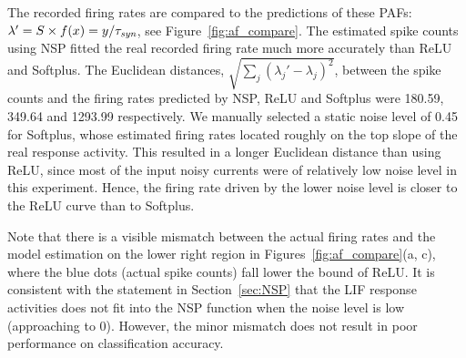 	The recorded firing rates are compared to the predictions of these PAFs: $\lambda' = S \times f(x) = y/\tau_{\textit{\textrm{syn}}}$, see Figure~\ref{fig:af_compare}.
	The estimated spike counts using NSP fitted the real recorded firing rate much more accurately than ReLU and Softplus.
	The Euclidean distances, $\sqrt{\sum_{j}(\lambda_j' - \lambda_j)^2}$, between the spike counts and the firing rates predicted by NSP, ReLU and Softplus were 180.59, 349.64 and 1293.99 respectively.
	We manually selected a static noise level of 0.45 for Softplus, whose estimated firing rates located roughly on the top slope of the real response activity.
	This resulted in a longer Euclidean distance than using ReLU, since most of the input noisy currents were of relatively low noise level in this experiment.
	Hence, the firing rate driven by the lower noise level is closer to the ReLU curve than to Softplus.

	Note that there is a visible mismatch between the actual firing rates and the model estimation on the lower right region in Figures~\ref{fig:af_compare}(a, c), where the blue dots (actual spike counts) fall lower the bound of ReLU.
	It is consistent with the statement in Section~\ref{sec:NSP} that the LIF response activities does not fit into the NSP function when the noise level is low (approaching to 0).
	However, the minor mismatch does not result in poor performance on classification accuracy.
	
